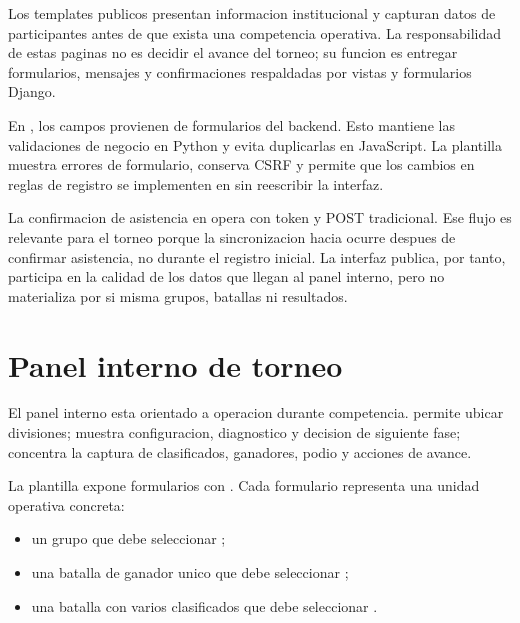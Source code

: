 Los templates publicos presentan informacion institucional y capturan datos de participantes antes de que exista una competencia operativa. La responsabilidad de estas paginas no es decidir el avance del torneo; su funcion es entregar formularios, mensajes y confirmaciones respaldadas por vistas y formularios Django.

En , los campos provienen de formularios del backend. Esto mantiene las validaciones de negocio en Python y evita duplicarlas en JavaScript. La plantilla muestra errores de formulario, conserva CSRF y permite que los cambios en reglas de registro se implementen en  sin reescribir la interfaz.

La confirmacion de asistencia en  opera con token y POST tradicional. Ese flujo es relevante para el torneo porque la sincronizacion hacia  ocurre despues de confirmar asistencia, no durante el registro inicial. La interfaz publica, por tanto, participa en la calidad de los datos que llegan al panel interno, pero no materializa por si misma grupos, batallas ni resultados.

\section{Panel interno de torneo}
\label{sec:frontend-panel-interno}

El panel interno esta orientado a operacion durante competencia.  permite ubicar divisiones;  muestra configuracion, diagnostico y decision de siguiente fase;  concentra la captura de clasificados, ganadores, podio y acciones de avance.

La plantilla  expone formularios con . Cada formulario representa una unidad operativa concreta:

\begin{itemize}
  \item un grupo que debe seleccionar ;
  \item una batalla de ganador unico que debe seleccionar ;
  \item una batalla con varios clasificados que debe seleccionar .
\end{itemize}

